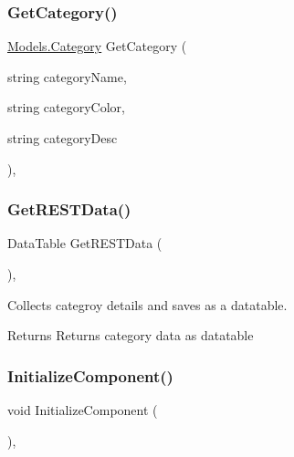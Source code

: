 \subsubsection{\texorpdfstring{Get\+Category()}{GetCategory()}}
{\footnotesize\ttfamily \hyperlink{classWildlifeTrackingApp_1_1Models_1_1Category}{Models.\+Category} Get\+Category (\begin{DoxyParamCaption}\item[{string}]{category\+Name,  }\item[{string}]{category\+Color,  }\item[{string}]{category\+Desc }\end{DoxyParamCaption})\hspace{0.3cm}{\ttfamily [inline]}, {\ttfamily [private]}}

\mbox{\label{classWildlifeTrackingApp_1_1Category_a8e22ded5eb81e2790b567eb19d3fe373}} 
\subsubsection{\texorpdfstring{Get\+R\+E\+S\+T\+Data()}{GetRESTData()}}
{\footnotesize\ttfamily Data\+Table Get\+R\+E\+S\+T\+Data (\begin{DoxyParamCaption}{ }\end{DoxyParamCaption})\hspace{0.3cm}{\ttfamily [inline]}, {\ttfamily [private]}}



Collects categroy details and saves as a datatable. 

\begin{DoxyReturn}{Returns}
Returns category data as datatable
\end{DoxyReturn}
\mbox{\label{classWildlifeTrackingApp_1_1Category_a6405d5db675d5338663195a4d12b4c9f}} 
\subsubsection{\texorpdfstring{Initialize\+Component()}{InitializeComponent()}}
{\footnotesize\ttfamily void Initialize\+Component (\begin{DoxyParamCaption}{ }\end{DoxyParamCaption})\hspace{0.3cm}{\ttfamily [inline]}, {\ttfamily [private]}}




